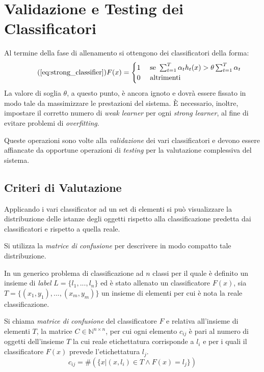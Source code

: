 
\chapter{Validazione e Testing dei Classificatori}
\label{chap:tuning}
    Al termine della fase di allenamento si ottengono dei classificatori della forma: 
    \begin{equation}\tag{\ref{eq:strong_classifier}}
        F(x) = 
        \begin{cases}
            1 & \text{ se } \sum_{t = 1}^{T} \alpha_t h_t(x) > \theta \sum_{t = 1}^{T} \alpha_t \\
            0 & \text{ altrimenti }
        \end{cases}
    \end{equation}
    La valore di soglia $\theta$, a questo punto, è ancora ignoto e dovrà essere fissato in modo tale da massimizzare le prestazioni del sistema. È necessario, inoltre, impostare il corretto numero di \emph{weak learner} per ogni \emph{strong learner}, al fine di evitare problemi di \emph{overfitting}.
    
    Queste operazioni sono volte alla \emph{validazione} dei vari classificatori e devono essere affiancate da opportune operazioni di \emph{testing} per la valutazione complessiva del sistema.

    \section{Criteri di Valutazione}
    \label{sec:evaluation_criteria}
        Applicando i vari classificator ad un set di elementi si può visualizzare la distribuzione delle istanze degli oggetti rispetto alla classificazione predetta dai classificatori e rispetto a quella reale.

        Si utilizza la \emph{matrice di confusione} per descrivere in modo compatto tale distribuzione.

        \begin{definition}
            In un generico problema di classificazione ad $n$ classi per il quale è definito un insieme di \emph{label} $L = \{l_1,..., l_n\}$ ed è stato allenato un classificatore $F(x)$, sia $T = \{(x_1,y_1),..., (x_m, y_m)\}$ un insieme di elementi per cui è nota la reale classificazione.

            Si chiama \emph{matrice di confusione} del classificatore $F$ e relativa all'insieme di elementi $T$, la matrice $C \in \mathbb{N}^{n \times n}$, per cui ogni elemento $c_{ij}$ è pari al numero di oggetti dell'insieme $T$ la cui reale etichettatura corrisponde a $l_i$ e per i quali il classificatore $F(x)$ prevede l'etichettatura $l_j$.
            \begin{equation}
            \label{subeq:confusion_matrix_element}
                 c_{ij} = \#(\{x|(x,l_i) \in T \wedge F(x) = l_j\})
            \end{equation} 
        \end{definition}


